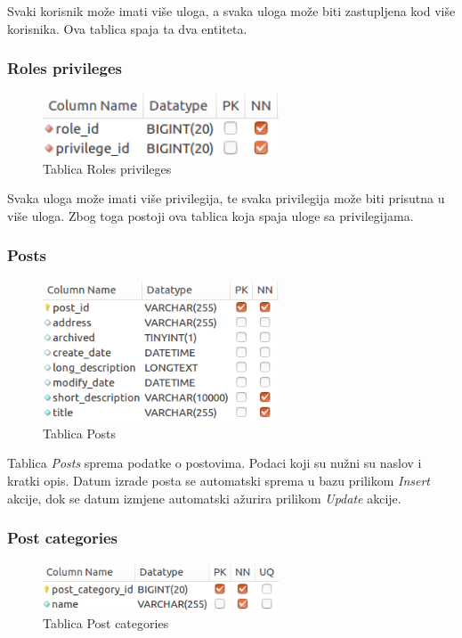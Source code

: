 \documentclass[zavrsni, numeric]{fer}
\begin{document}
Svaki korisnik može imati više uloga, a svaka uloga može biti zastupljena kod više korisnika. Ova tablica spaja ta dva entiteta.

\subsubsection{Roles privileges}

\begin{figure}[H]
	\centering
	\includegraphics[width=7cm]{slike/t-roles_privileges.png}
	\caption{Tablica Roles privileges}
	\label{fig:t-roles_privileges}
\end{figure}

Svaka uloga može imati više privilegija, te svaka privilegija može biti prisutna u više uloga. Zbog toga postoji ova tablica koja spaja uloge sa privilegijama.

\subsubsection{Posts}

\begin{figure}[H]
	\centering
	\includegraphics[width=7cm]{slike/t-posts.png}
	\caption{Tablica Posts}
	\label{fig:t-posts}
\end{figure}

Tablica \textit{Posts} sprema podatke o postovima. Podaci koji su nužni su naslov i kratki opis. Datum izrade posta se automatski sprema u bazu prilikom \textit{Insert} akcije, dok se datum izmjene automatski ažurira prilikom \textit{Update} akcije.

\subsubsection{Post categories}

\begin{figure}[H]
	\centering
	\includegraphics[width=7cm]{slike/t-post_categories.png}
	\caption{Tablica Post categories}
	\label{fig:t-post_categories}
\end{figure}
\end{document}

